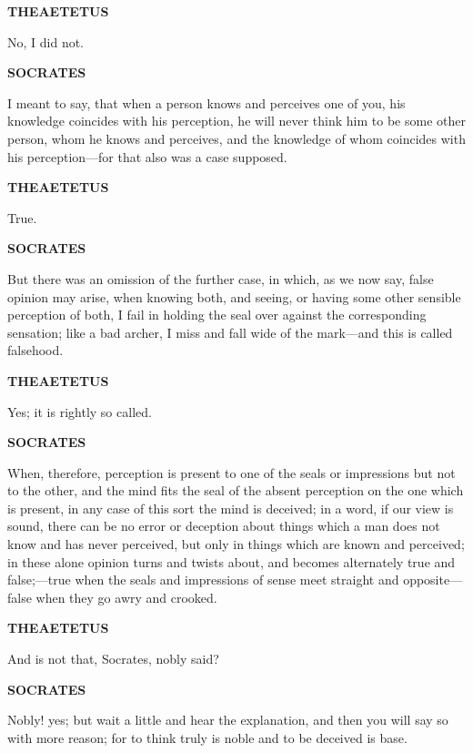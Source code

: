 \documentclass[11pt,letter]{article}
\begin{document}
\par \textbf{THEAETETUS}
\par   No, I did not.

\par \textbf{SOCRATES}
\par   I meant to say, that when a person knows and perceives one of you, his knowledge coincides with his perception, he will never think him to be some other person, whom he knows and perceives, and the knowledge of whom coincides with his perception—for that also was a case supposed.

\par \textbf{THEAETETUS}
\par   True.

\par \textbf{SOCRATES}
\par   But there was an omission of the further case, in which, as we now say, false opinion may arise, when knowing both, and seeing, or having some other sensible perception of both, I fail in holding the seal over against the corresponding sensation; like a bad archer, I miss and fall wide of the mark—and this is called falsehood.

\par \textbf{THEAETETUS}
\par   Yes; it is rightly so called.

\par \textbf{SOCRATES}
\par   When, therefore, perception is present to one of the seals or impressions but not to the other, and the mind fits the seal of the absent perception on the one which is present, in any case of this sort the mind is deceived; in a word, if our view is sound, there can be no error or deception about things which a man does not know and has never perceived, but only in things which are known and perceived; in these alone opinion turns and twists about, and becomes alternately true and false;—true when the seals and impressions of sense meet straight and opposite—false when they go awry and crooked.

\par \textbf{THEAETETUS}
\par   And is not that, Socrates, nobly said?

\par \textbf{SOCRATES}
\par   Nobly! yes; but wait a little and hear the explanation, and then you will say so with more reason; for to think truly is noble and to be deceived is base.
\end{document}

